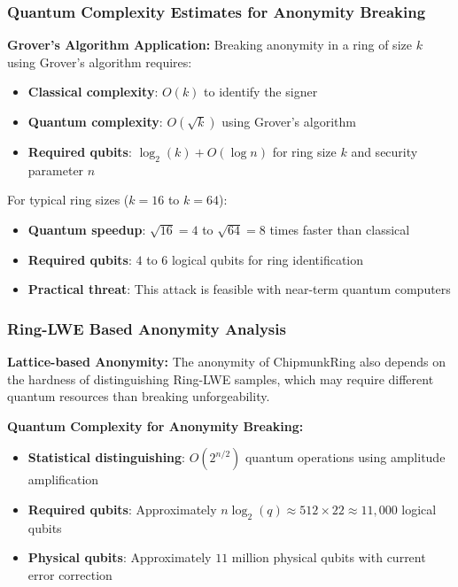 \documentclass[11pt,a4paper]{article}
\begin{document}
\subsubsection{Quantum Complexity Estimates for Anonymity Breaking}

\textbf{Grover's Algorithm Application:} Breaking anonymity in a ring of size $k$ using Grover's algorithm requires:
\begin{itemize}
\item \textbf{Classical complexity}: $O(k)$ to identify the signer
\item \textbf{Quantum complexity}: $O(\sqrt{k})$ using Grover's algorithm
\item \textbf{Required qubits}: $\log_2(k) + O(\log n)$ for ring size $k$ and security parameter $n$
\end{itemize}

For typical ring sizes ($k = 16$ to $k = 64$):
\begin{itemize}
\item \textbf{Quantum speedup}: $\sqrt{16} = 4$ to $\sqrt{64} = 8$ times faster than classical
\item \textbf{Required qubits}: $4$ to $6$ logical qubits for ring identification
\item \textbf{Practical threat}: This attack is feasible with near-term quantum computers
\end{itemize}

\subsubsection{Ring-LWE Based Anonymity Analysis}

\textbf{Lattice-based Anonymity:} The anonymity of ChipmunkRing also depends on the hardness of distinguishing Ring-LWE samples, which may require different quantum resources than breaking unforgeability.

\textbf{Quantum Complexity for Anonymity Breaking:}
\begin{itemize}
\item \textbf{Statistical distinguishing}: $O(2^{n/2})$ quantum operations using amplitude amplification
\item \textbf{Required qubits}: Approximately $n \log_2(q) \approx 512 \times 22 \approx 11,000$ logical qubits
\item \textbf{Physical qubits}: Approximately $11$ million physical qubits with current error correction
\end{itemize}
\end{document}
